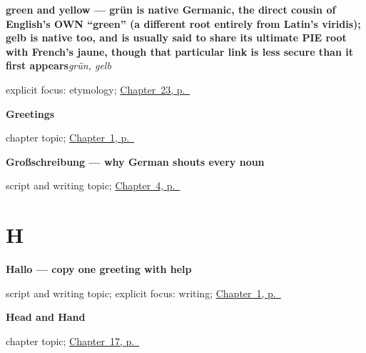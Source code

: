 \noindent\begin{minipage}[t]{\linewidth}
\raggedright
\textbf{green and yellow — grün is native Germanic, the direct cousin of English's OWN \textquotedblleft{}green\textquotedblright{} (a different root entirely from Latin's viridis); gelb is native too, and is usually said to share its ultimate PIE root with French's jaune, though that particular link is less secure than it first appears}\enspace\emph{grün, gelb}\par
\footnotesize explicit focus: etymology; \hyperref[ch:ge-green-and-yellow]{Chapter~23, p.~\pageref*{ch:ge-green-and-yellow}}
\end{minipage}\par\smallskip

\noindent\begin{minipage}[t]{\linewidth}
\raggedright
\textbf{Greetings}\par
\footnotesize chapter topic; \hyperref[ch:greetings]{Chapter~1, p.~\pageref*{ch:greetings}}
\end{minipage}\par\smallskip

\noindent\begin{minipage}[t]{\linewidth}
\raggedright
\textbf{Großschreibung — why German shouts every noun}\par
\footnotesize script and writing topic; \hyperref[ch:farewells]{Chapter~4, p.~\pageref*{ch:farewells}}
\end{minipage}\par\smallskip

\section*{H}

\noindent\begin{minipage}[t]{\linewidth}
\raggedright
\textbf{Hallo — copy one greeting with help}\par
\footnotesize script and writing topic; explicit focus: writing; \hyperref[ch:greetings]{Chapter~1, p.~\pageref*{ch:greetings}}
\end{minipage}\par\smallskip

\noindent\begin{minipage}[t]{\linewidth}
\raggedright
\textbf{Head and Hand}\par
\footnotesize chapter topic; \hyperref[ch:ge-head-and-hand]{Chapter~17, p.~\pageref*{ch:ge-head-and-hand}}
\end{minipage}\par\smallskip

